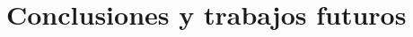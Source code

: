 \documentclass[12pt,a4paper,oneside]{book} %
\begin{document}


\chapter{Conclusiones y trabajos futuros}






\pagebreak
\thispagestyle{empty}
\pagestyle{empty}


\end{document}
